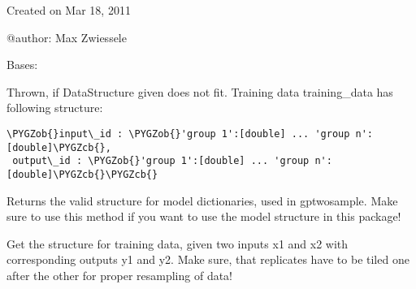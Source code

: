 \documentclass[letterpaper,10pt]{sphinxmanual}
\def\PYGZob{\char`\{}
\def\PYGZcb{\char`\}}
\begin{document}
Created on Mar 18, 2011

@author: Max Zwiessele

\begin{fulllineitems}
\label{data:gptwosample.data.data_base.DataStructureError}
Bases: 

Thrown, if DataStructure given does not fit.
Training data training\_data has following structure:

\begin{Verbatim}[commandchars=\\\{\}]
\PYGZob{}input\_id : \PYGZob{}'group 1':[double] ... 'group n':[double]\PYGZcb{},
 output\_id : \PYGZob{}'group 1':[double] ... 'group n':[double]\PYGZcb{}\PYGZcb{}
\end{Verbatim}

\end{fulllineitems}


\begin{fulllineitems}
\label{data:gptwosample.data.data_base.get_model_structure}
Returns the valid structure for model dictionaries, used in gptwosample.
Make sure to use this method if you want to use the model structure in this package!

\end{fulllineitems}


\begin{fulllineitems}
\label{data:gptwosample.data.data_base.get_training_data_structure}
Get the structure for training data, given two inputs x1 and x2
with corresponding outputs y1 and y2. Make sure, that replicates have
to be tiled one after the other for proper resampling of data!

\end{fulllineitems}

\end{document}

